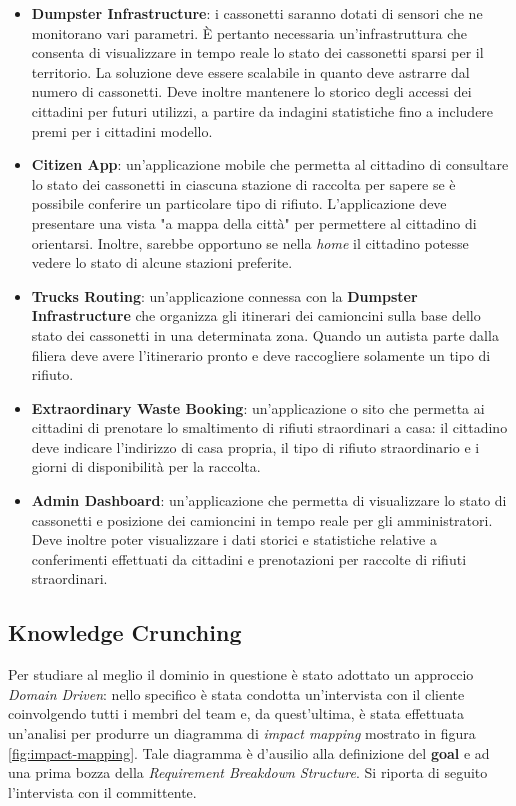 \begin{itemize}
    \item \textbf{Dumpster Infrastructure}: i cassonetti saranno dotati di sensori che ne monitorano vari parametri.
    È pertanto necessaria un'infrastruttura che consenta di visualizzare in tempo reale lo stato dei cassonetti sparsi per il territorio.
    La soluzione deve essere scalabile in quanto deve astrarre dal numero di cassonetti.
    Deve inoltre mantenere lo storico degli accessi dei cittadini per futuri utilizzi, a partire da indagini statistiche fino a includere premi per i cittadini modello.
    \item \textbf{Citizen App}: un'applicazione mobile che permetta al cittadino di consultare lo stato dei cassonetti in ciascuna stazione di raccolta per sapere se è possibile conferire un particolare tipo di rifiuto.
    L'applicazione deve presentare una vista "a mappa della città" per permettere al cittadino di orientarsi.
    Inoltre, sarebbe opportuno se nella \textit{home} il cittadino potesse vedere lo stato di alcune stazioni preferite.
    \item \textbf{Trucks Routing}: un'applicazione connessa con la \textbf{Dumpster Infrastructure} che organizza gli itinerari dei camioncini sulla base dello stato dei cassonetti in una determinata zona.
    Quando un autista parte dalla filiera deve avere l'itinerario pronto e deve raccogliere solamente un tipo di rifiuto.
    \item \textbf{Extraordinary Waste Booking}: un'applicazione o sito che permetta ai cittadini di prenotare lo smaltimento di rifiuti straordinari a casa: il cittadino deve indicare l'indirizzo di casa propria, il tipo di rifiuto straordinario e i giorni di disponibilità per la raccolta.
    \item \textbf{Admin Dashboard}: un'applicazione che permetta di visualizzare lo stato di cassonetti e posizione dei camioncini in tempo reale per gli amministratori.
    Deve inoltre poter visualizzare i dati storici e statistiche relative a conferimenti effettuati da cittadini e prenotazioni per raccolte di rifiuti straordinari.
\end{itemize}

\subsection{Knowledge Crunching}
Per studiare al meglio il dominio in questione è stato adottato un approccio \textit{Domain Driven}: nello specifico è stata condotta un'intervista con il cliente coinvolgendo tutti i membri del team e, da quest'ultima, è stata effettuata un'analisi per produrre un diagramma di \textit{impact mapping} mostrato in figura \ref{fig:impact-mapping}. Tale diagramma è d'ausilio alla definizione del \textbf{goal} e ad una prima bozza della \textit{Requirement Breakdown Structure}.
Si riporta di seguito l'intervista con il committente.

